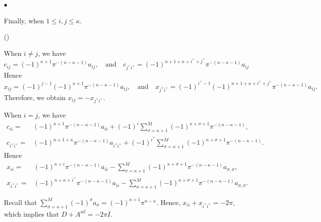 \documentclass[pdflatex,sn-mathphys-num]{sn-jnl}%
\theoremstyle{thmstyleone}%
\theoremstyle{thmstyletwo}%
\numberwithin{equation}{subsection}
\theoremstyle{thmstylethree}%
\newcommand{\ad}{\mathrm{ad}}
\newenvironment{altenumerate}
	{\begin{list}
			{(\theenumi) }
			{\usecounter{enumi}
				\setlength{\labelwidth}{0pt}
				\setlength{\labelsep}{0pt}
				\setlength{\leftmargin}{0pt}
				\setlength{\itemsep}{\the\smallskipamount}
				\renewcommand{\theenumi}{\roman{enumi}}
		}}
		{\end{list}}
\newenvironment{altitemize}
	{\begin{list}
			{$\bullet$}
			{\setlength{\labelwidth}{0pt}
				\setlength{\itemindent}{5pt}
				\setlength{\labelsep}{5pt}
				\setlength{\leftmargin}{0pt}
				\setlength{\itemsep}{\the\smallskipamount}
		}}
		{\end{list}}
\begin{document}
\begin{altitemize}
\item Finally, when $1\leq i,j\leq \kappa$.
\begin{altenumerate}
\item When $i\neq j$, we have 
\begin{equation*}
c_{ij}=(-1)^{\kappa+1}\pi^{-(n-\kappa-1)}a_{ij},
\quad\text{and}\quad
c_{j^\vee i^\vee}=(-1)^{n+1+\kappa+i^\vee+j^\vee}\pi^{-(n-\kappa-1)}a_{ij}
\end{equation*}
Hence
\begin{equation*}
x_{ij}=(-1)^{j-1}(-1)^{\kappa+1}\pi^{-(n-\kappa-1)}a_{ij},
\quad\text{and}\quad
x_{j^\vee i^\vee}=(-1)^{i^\vee-1}(-1)^{n+1+\kappa+i^\vee+j^\vee}\pi^{-(n-\kappa-1)}a_{ij}.
\end{equation*}
Therefore, we obtain $x_{ij}=-x_{j^\vee i^\vee}$.
\item When $i=j$, we have
\begin{align*}
c_{ii}={}&(-1)^{\kappa+1}\pi^{-(n-\kappa-1)}a_{ii}+(-1)^i\sum_{\sigma=\kappa+1}^M(-1)^{\kappa+\sigma+1}\pi^{-(n-\kappa-1)},\\
c_{i^\vee i^\vee}={}&(-1)^{n+1+\kappa}\pi^{-(n-\kappa-1)}a_{i^\vee i^\vee}+(-1)^{i^\vee}\sum_{\sigma=\kappa+1}^M(-1)^{\kappa+\sigma+1}\pi^{-(n-\kappa-1)}.
\end{align*}
Hence
\begin{align*}
x_{ii}={}&(-1)^{\kappa+i}\pi^{-(n-\kappa-1)}a_{ii}-\sum_{\sigma=\kappa+1}^M(-1)^{\kappa+\sigma+1}\pi^{-(n-\kappa-1)}a_{\sigma,\sigma},\\
x_{i^\vee i^\vee}={}&(-1)^{n+\kappa+i^\vee}\pi^{-(n-\kappa-1)}a_{ii}-\sum_{\sigma=\kappa+1}^M(-1)^{\kappa+\sigma+1}\pi^{-(n-\kappa-1)}a_{\sigma,\sigma}.
\end{align*}

Recall that $\sum_{\sigma=\kappa+1}^M (-1)^\sigma a_\sigma=(-1)^{\kappa+1}\pi^{n-\kappa}$. Hence,
$x_{ii}+x_{i^\vee i^\vee}=-2\pi$, which implies that $D+A^{\ad}=-2\pi I$.
\end{altenumerate}
\end{altitemize}	
\end{document}
